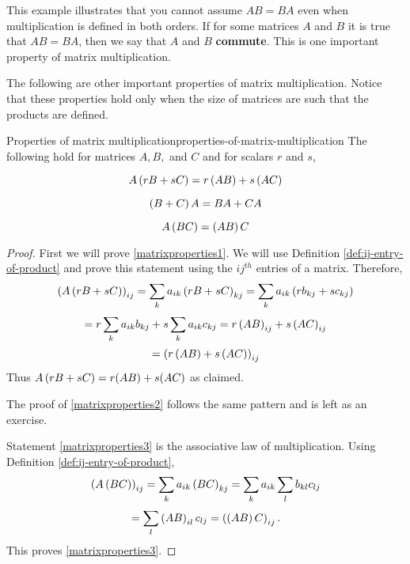 This example illustrates that you cannot assume $AB=BA$ even when
multiplication is defined in both orders. If for some matrices $A$ and
$B$ it is true that $AB=BA$, then we say that $A$ and $B$ \textbf{commute}. This is one 
important property of matrix multiplication.

The following are other important properties of matrix multiplication.
Notice that these properties hold only when the size of matrices are such that the products are defined. 

\begin{proposition}{Properties of matrix multiplication}{properties-of-matrix-multiplication}
The following hold for matrices $A,B,$ and $C$ and for scalars $r$ and $s$,

\begin{equation}
A\left(rB+sC\right) =r\left(AB\right) +s\left(AC\right)  \label{matrixproperties1}
\end{equation}

\begin{equation}
\left(B+C\right) A=BA+CA  \label{matrixproperties2}
\end{equation}

\begin{equation}
A\left(BC\right) =\left(AB\right) C  \label{matrixproperties3}
\end{equation}
\end{proposition}

\begin{proof}
 First we will prove \ref{matrixproperties1}. We will use Definition \ref{def:ij-entry-of-product} 
and prove this statement using the $ij^{th}$ entries of a matrix. 
Therefore, 
\begin{equation*}
\left(A\left(rB+sC\right) \right) _{ij}=\sum_{k}a_{ik}\left(rB+sC\right)
_{kj}=\sum_{k}a_{ik}\left(rb_{kj}+sc_{kj}\right)
\end{equation*}
\begin{equation*}
=r\sum_{k}a_{ik}b_{kj}+s\sum_{k}a_{ik}c_{kj}=r\left(AB\right) _{ij}+s\left(
AC\right) _{ij}
\end{equation*}
\begin{equation*}
=\left(r\left(AB\right) +s\left(AC\right) \right) _{ij}
\end{equation*}
Thus $A\left(rB+sC\right) =r(AB)+s(AC)$ as claimed. 

The proof of \ref{matrixproperties2} follows the same pattern and is left as an exercise. 

Statement \ref{matrixproperties3} is the associative law of multiplication. Using
Definition \ref{def:ij-entry-of-product},
\begin{equation*}
\left(A\left(BC\right) \right) _{ij}=\sum_{k}a_{ik}\left(BC\right)
_{kj}=\sum_{k}a_{ik}\sum_{l}b_{kl}c_{lj}
\end{equation*}
\begin{equation*}
=\sum_{l}\left(AB\right) _{il}c_{lj}=\left(\left(AB\right) C\right) _{ij}.
\end{equation*}
This proves \ref{matrixproperties3}.
\end{proof}
